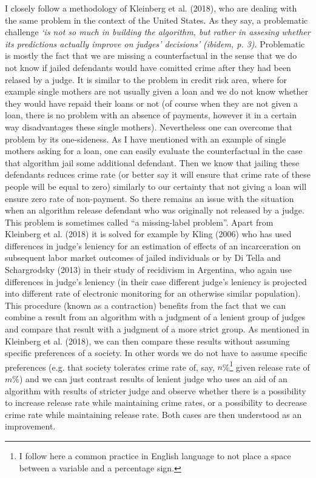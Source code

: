 \documentclass[12pt, twoside]{book} %
\begin{document}
I closely follow a methodology of Kleinberg et al. (2018), who are dealing with the same problem in the context of the United States. As they say, a problematic challenge \textit{‘is not so much in building the algorithm, but rather in assesing whether its predictions actually improve on judges' decisions’ (\textit{ibidem}, p. 3)}. Problematic is mostly the fact that we are missing a counterfactual in the sense that we do not know if jailed defendants would have comitted crime after they had been relased by a judge. It is similar to the problem in credit risk area, where for example single mothers are not usually given a loan and we do not know whether they would have repaid their loans or not (of course when they are not given a loan, there is no problem with an absence of payments, however it in a certain way disadvantages these single mothers). Nevertheless one can overcome that problem by its one-sideness. As I have mentioned with an example of single mothers asking for a loan, one can easily evaluate the counterfactual in the case that algorithm jail some additional  defendant. Then we know that jailing these defendants reduces crime rate (or better say it will ensure that crime rate of these people will be equal to zero) similarly to our certainty that not giving a loan will ensure zero rate of non-payment. So there remains an issue with the situation when an algorithm release defendant who was originally not released by a judge. This problem is sometimes called “a missing-label problem”. Apart from Kleinberg et al. (2018) it is solved for example by Kling (2006) who has used differences in judge's leniency for an estimation of effects of an incarceration on subsequent labor market outcomes of jailed individuals or by Di Tella and Schargrodsky (2013) in their study of recidivism in Argentina, who again use differences in judge's leniency (in their case different judge's leniency is projected into different rate of electronic monitoring for an otherwise similar population). This procedure (known as a contraction) benefits from the fact that we can combine a result from an algorithm with a judgment of a lenient group of judges and compare that result with a judgment of a more strict group. As mentioned in Kleinberg et al. (2018), we can then compare these results without assuming specific preferences of a society. In other words we do not have to assume specific preferences (e.g. that society tolerates crime rate of, say, $n$\%\footnote{I follow here a common practice in English language to not place a space between a variable and a percentage sign.} given release rate of $m$\%) and we can just contrast results of lenient judge who uses an aid of an algorithm with results of stricter judge and observe whether there is a possibility to increase release rate while maintaining crime rates, or a possibility to decrease crime rate while maintaining release rate. Both cases are then understood as an improvement.\newline
\end{document}
